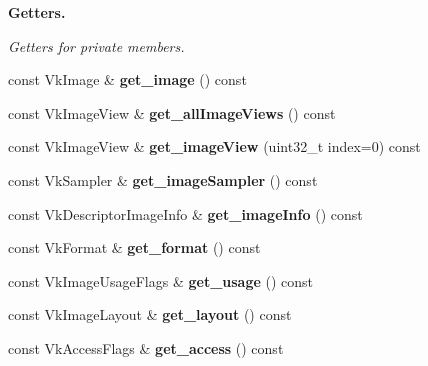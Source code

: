 \begin{Indent}\textbf{ Getters.}\par
{\em Getters for private members. }\begin{DoxyCompactItemize}
\item 
\mbox{\label{classblaze_1_1Texture2D_ac004b5247e312ce79785f219bde06225}} 
const Vk\+Image \& {\bfseries get\+\_\+image} () const
\item 
\mbox{\label{classblaze_1_1Texture2D_aed70b91996d8f47e9d15886c064cba30}} 
const Vk\+Image\+View \& {\bfseries get\+\_\+all\+Image\+Views} () const
\item 
\mbox{\label{classblaze_1_1Texture2D_a5952f292ce062a2b40c99ff8afc91021}} 
const Vk\+Image\+View \& {\bfseries get\+\_\+image\+View} (uint32\+\_\+t index=0) const
\item 
\mbox{\label{classblaze_1_1Texture2D_a93898119be7c0b4dbfc52b82b5ce3357}} 
const Vk\+Sampler \& {\bfseries get\+\_\+image\+Sampler} () const
\item 
\mbox{\label{classblaze_1_1Texture2D_a6b2aaf7b3134201e4824d0716bbc6628}} 
const Vk\+Descriptor\+Image\+Info \& {\bfseries get\+\_\+image\+Info} () const
\item 
\mbox{\label{classblaze_1_1Texture2D_ace9f44533af55d17b0326af0a5657047}} 
const Vk\+Format \& {\bfseries get\+\_\+format} () const
\item 
\mbox{\label{classblaze_1_1Texture2D_a4cae2c2e2b80a6da7631a8f6a4cf7389}} 
const Vk\+Image\+Usage\+Flags \& {\bfseries get\+\_\+usage} () const
\item 
\mbox{\label{classblaze_1_1Texture2D_ab0527830d0530c2023a4cb4989218ba5}} 
const Vk\+Image\+Layout \& {\bfseries get\+\_\+layout} () const
\item 
\mbox{\label{classblaze_1_1Texture2D_a64f03437a05b13cdfbe4bc438977e1eb}} 
const Vk\+Access\+Flags \& {\bfseries get\+\_\+access} () const
\item 

\end{DoxyCompactItemize}
\end{Indent}
